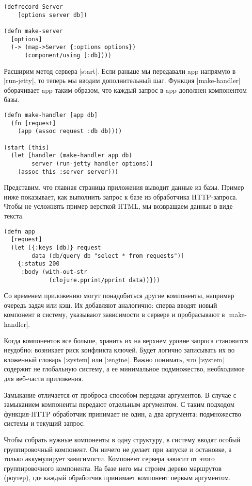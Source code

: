 \begin{verbatim}
(defrecord Server
    [options server db])

(defn make-server
  [options]
  (-> (map->Server {:options options})
      (component/using [:db])))
\end{verbatim}

Расширим метод сервера \spverb|start|. Если раньше мы передавали app напрямую в
\spverb|run-jetty|, то теперь мы вводим дополнительный шаг. Функция \spverb|make-handler|
оборачивает app таким образом, что каждый запрос в app дополнен компонентом
базы.

\begin{verbatim}
(defn make-handler [app db]
  (fn [request]
    (app (assoc request :db db))))

(start [this]
  (let [handler (make-handler app db)
        server (run-jetty handler options)]
    (assoc this :server server)))
\end{verbatim}

Представим, что главная страница приложения выводит данные из базы. Пример ниже
показывает, как выполнить запрос к базе из обработчика HTTP-запроса. Чтобы не
усложнять пример версткой HTML, мы возвращаем данные в виде текста.

\begin{verbatim}
(defn app
  [request]
  (let [{:keys [db]} request
        data (db/query db "select * from requests")]
    {:status 200
     :body (with-out-str
             (clojure.pprint/pprint data))}))
\end{verbatim}

Со временем приложению могут понадобиться другие компоненты, например очередь
задач или кэш. Их добавляют аналогично: сперва вводят новый компонент в систему,
указывают зависимости в сервере и пробрасывают в \spverb|make-handler|.

Когда компонентов все больше, хранить их на верхнем уровне запроса становится
неудобно: возникает риск конфликта ключей. Будет логично записывать их во
вложенный словарь \spverb|:system| или \spverb|:engine|. Важно понимать, что \spverb|:system|
содержит не глобальную систему, а ее минимальное подмножество, необходимое для
веб-части приложения.

Замыкание отличается от проброса способом передачи аргументов. В случае с
замыканием компоненты передают отдельным аргументом. С таким подходом
функция-HTTP обработчик принимает не один, а два аргумента: подмножество системы
и текущий запрос.

Чтобы собрать нужные компоненты в одну структуру, в систему вводят особый
группировочный компонент. Он ничего не делает при запуске и остановке, а только
аккумулирует зависимости. Компонент сервера зависит от этого группировочного
компонента. На базе него мы строим дерево маршрутов (роутер), где каждый
обработчик принимает компонент первым аргументом.


